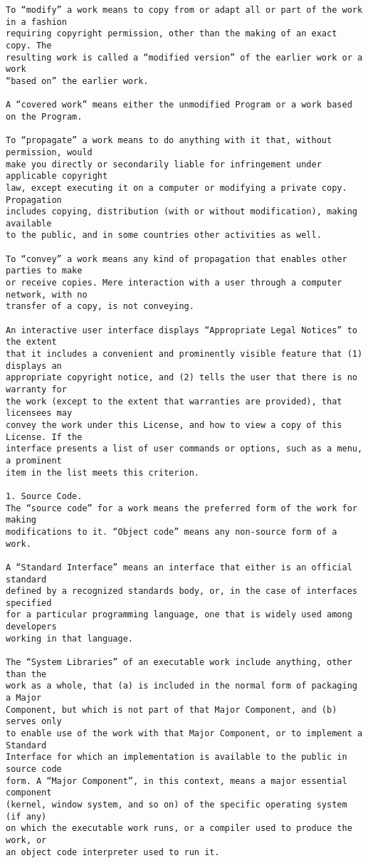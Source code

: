 \begin{verbatim}
To “modify” a work means to copy from or adapt all or part of the work in a fashion
requiring copyright permission, other than the making of an exact copy. The
resulting work is called a “modified version” of the earlier work or a work
“based on” the earlier work.

A “covered work” means either the unmodified Program or a work based on the Program.

To “propagate” a work means to do anything with it that, without permission, would
make you directly or secondarily liable for infringement under applicable copyright
law, except executing it on a computer or modifying a private copy. Propagation
includes copying, distribution (with or without modification), making available
to the public, and in some countries other activities as well.

To “convey” a work means any kind of propagation that enables other parties to make
or receive copies. Mere interaction with a user through a computer network, with no
transfer of a copy, is not conveying.

An interactive user interface displays “Appropriate Legal Notices” to the extent
that it includes a convenient and prominently visible feature that (1) displays an
appropriate copyright notice, and (2) tells the user that there is no warranty for
the work (except to the extent that warranties are provided), that licensees may
convey the work under this License, and how to view a copy of this License. If the
interface presents a list of user commands or options, such as a menu, a prominent
item in the list meets this criterion.

1. Source Code.
The “source code” for a work means the preferred form of the work for making
modifications to it. “Object code” means any non-source form of a work.

A “Standard Interface” means an interface that either is an official standard
defined by a recognized standards body, or, in the case of interfaces specified
for a particular programming language, one that is widely used among developers
working in that language.

The “System Libraries” of an executable work include anything, other than the
work as a whole, that (a) is included in the normal form of packaging a Major
Component, but which is not part of that Major Component, and (b) serves only
to enable use of the work with that Major Component, or to implement a Standard
Interface for which an implementation is available to the public in source code
form. A “Major Component”, in this context, means a major essential component
(kernel, window system, and so on) of the specific operating system (if any)
on which the executable work runs, or a compiler used to produce the work, or
an object code interpreter used to run it.


\end{verbatim}
